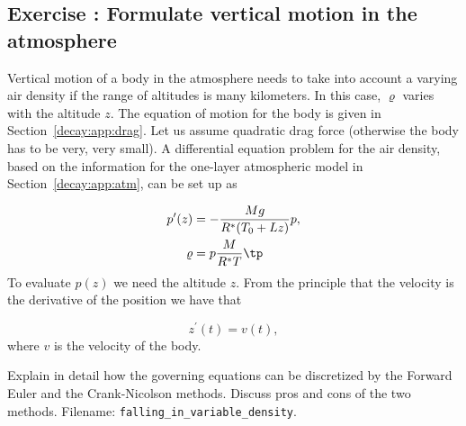 \documentclass[graybox,sectrefs,envcountresetchap,open=right,final]{svmonodo}
\newenvironment{doconceexercise}{}{}
\newcounter{doconceexercisecounter}
\begin{document}
\begin{doconceexercise}

\subsection*{Exercise \thedoconceexercisecounter: Formulate vertical motion in the atmosphere}

\label{decay:app:exer:drag:atm1}

Vertical motion of a body in the atmosphere needs to take into
account a varying air density if the range of altitudes is
many kilometers. In this case, $\varrho$ varies with the altitude $z$.
The equation of motion for the body is given in
Section~\ref{decay:app:drag}. Let us assume quadratic drag force
(otherwise the body has to be very, very small).
A differential equation problem for the air density, based on
the information for the one-layer atmospheric model in
Section~\ref{decay:app:atm}, can be set up as

\begin{align}
p^{\prime}(z) &= -\frac{Mg}{R^*(T_0+Lz)} p,\\ 
\varrho &= p \frac{M}{R^*T}
\tp
\end{align}
To evaluate $p(z)$ we need the altitude $z$. From the principle that the
velocity is the derivative of the position we have that

\begin{equation}
z^{\prime}(t) = v(t),
\end{equation}
where $v$ is the velocity of the body.

Explain in detail how the governing equations can be discretized
by the Forward Euler and the Crank-Nicolson methods.
Discuss pros and cons of the two methods.
\noindent Filename: \Verb!falling_in_variable_density!.

\end{doconceexercise}
\end{document}
